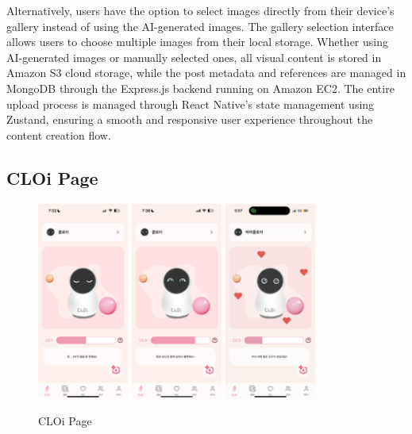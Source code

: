 \documentclass[conference]{IEEEtran}
\begin{document}
        Alternatively, users have the option to select images directly from their device's gallery instead of using the AI-generated images. The gallery selection interface allows users to choose multiple images from their local storage. Whether using AI-generated images or manually selected ones, all visual content is stored in Amazon S3 cloud storage, while the post metadata and references are managed in MongoDB through the Express.js backend running on Amazon EC2. The entire upload process is managed through React Native's state management using Zustand, ensuring a smooth and responsive user experience throughout the content creation flow.

  \subsection{CLOi Page}
        \begin{figure}[htbp]
            \centerline{\includegraphics[width=3cm]{Images/page/cloi1.png}
            \includegraphics[width=3cm]{Images/page/cloi4.png}
            \includegraphics[width=3cm]{Images/page/cloiTouched.png}}
            \caption{CLOi Page}
            \label{fig}
        \end{figure}
\end{document}
